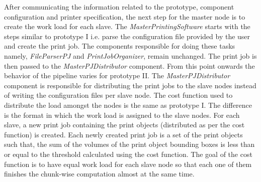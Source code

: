 After communicating the information related to the prototype, component configuration and printer specification, the next step for the master node is to create the work load for each slave. The \textit{MasterPrintingSoftware} starts with the steps similar to prototype I i.e. parse the configuration file provided by the user and create the print job. The components responsible for doing these tasks namely, \textit{FileParserPJ} and \textit{PrintJobOrganizer}, remain unchanged. The print job is then passed to the \textit{MasterPJDistributor} component. From this point onwards the behavior of the pipeline varies for prototype II. The \textit{MasterPJDistributor} component is responsible for distributing the print jobs to the slave nodes instead of writing the configuration files per slave node. The cost function used to distribute the load amongst the nodes is the same as prototype I. The difference is the format in which the work load is assigned to the slave nodes. For each slave, a new print job containing the print objects (distributed as per the cost function) is created. Each newly created print job is a set of the print objects such that, the sum of the volumes of the print object bounding boxes is less than or equal to the threshold calculated using the cost function. The goal of the cost function is to have equal work load for each slave node so that each one of them finishes the chunk-wise computation almost at the same time. \newline

